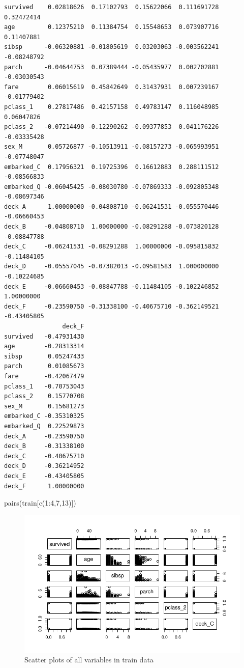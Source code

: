 \documentclass[
  letterpaper,
  DIV=11,
  numbers=noendperiod]{scrartcl}
\newenvironment{Shaded}{\begin{snugshade}}{\end{snugshade}}
\newcommand{\DecValTok}[1]{\textcolor[rgb]{0.68,0.00,0.00}{#1}}
\newcommand{\FunctionTok}[1]{\textcolor[rgb]{0.28,0.35,0.67}{#1}}
\newcommand{\NormalTok}[1]{\textcolor[rgb]{0.00,0.23,0.31}{#1}}
\newcommand{\SpecialCharTok}[1]{\textcolor[rgb]{0.37,0.37,0.37}{#1}}
\begin{document}
\begin{verbatim}
survived    0.02818626  0.17102793  0.15622066  0.111691728  0.32472414
age         0.12375210  0.11384754  0.15548653  0.073907716  0.11407881
sibsp      -0.06320881 -0.01805619  0.03203063 -0.003562241 -0.08248792
parch      -0.04644753  0.07389444 -0.05435977  0.002702881 -0.03030543
fare        0.06015619  0.45842649  0.31437931  0.007239167 -0.01779402
pclass_1    0.27817486  0.42157158  0.49783147  0.116048985  0.06047826
pclass_2   -0.07214490 -0.12290262 -0.09377853  0.041176226 -0.03335428
sex_M       0.05726877 -0.10513911 -0.08157273 -0.065993951 -0.07748047
embarked_C  0.17956321  0.19725396  0.16612883  0.288111512 -0.08566833
embarked_Q -0.06045425 -0.08030780 -0.07869333 -0.092805348 -0.08697346
deck_A      1.00000000 -0.04808710 -0.06241531 -0.055570446 -0.06660453
deck_B     -0.04808710  1.00000000 -0.08291288 -0.073820128 -0.08847788
deck_C     -0.06241531 -0.08291288  1.00000000 -0.095815832 -0.11484105
deck_D     -0.05557045 -0.07382013 -0.09581583  1.000000000 -0.10224685
deck_E     -0.06660453 -0.08847788 -0.11484105 -0.102246852  1.00000000
deck_F     -0.23590750 -0.31338100 -0.40675710 -0.362149521 -0.43405805
                deck_F
survived   -0.47931430
age        -0.28313314
sibsp       0.05247433
parch       0.01085673
fare       -0.42067479
pclass_1   -0.70753043
pclass_2    0.15770708
sex_M       0.15681273
embarked_C -0.35310325
embarked_Q  0.22529873
deck_A     -0.23590750
deck_B     -0.31338100
deck_C     -0.40675710
deck_D     -0.36214952
deck_E     -0.43405805
deck_F      1.00000000
\end{verbatim}

\begin{Shaded}
\begin{Highlighting}[]
\FunctionTok{pairs}\NormalTok{(train[}\FunctionTok{c}\NormalTok{(}\DecValTok{1}\SpecialCharTok{:}\DecValTok{4}\NormalTok{,}\DecValTok{7}\NormalTok{,}\DecValTok{13}\NormalTok{)])}
\end{Highlighting}
\end{Shaded}

\begin{figure}[H]

{\centering \includegraphics{FinalProject_files/figure-pdf/unnamed-chunk-14-1.pdf}

}

\caption{Scatter plots of all variables in train data}

\end{figure}%
\end{document}
